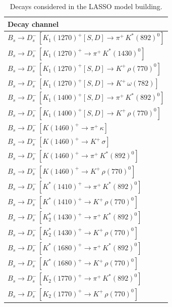 \begin{table}[h]
  \small
  \centering
  \caption{Decays considered in the LASSO model building. \label{tab:components}}
           \begin{tabular} {@{\hspace{0.5cm}}l@{\hspace{0.25cm}}}
     \hline \hline
	 Decay channel  \\ \hline
              $B_s \to D_s^- \, [K_{1}(1270)^{+}[S,D]\to \pi^+ \, K^{*}(892)^{0}]$ \\
              $B_s \to D_s^- \, [K_{1}(1270)^{+}\to \pi^+ \, K^{*}(1430)^{0}]$ \\
              $B_s \to D_s^- \, [K_{1}(1270)^{+}[S,D]\to K^+ \, \rho(770)^{0}]$ \\
              $B_s \to D_s^- \, [K_{1}(1270)^{+}[S,D]\to K^+ \, \omega(782)]$ \\
              $B_s \to D_s^- \, [K_{1}(1400)^{+}[S,D]\to \pi^+ \, K^{*}(892)^{0}]$ \\
              $B_s \to D_s^- \, [K_{1}(1400)^{+}[S,D]\to K^+ \, \rho(770)^{0}]$ \\
              $B_s \to D_s^- \, [K(1460)^{+}\to \pi^+ \, \kappa]$ \\
              $B_s \to D_s^- \, [K(1460)^{+}\to K^+ \, \sigma]$ \\
              $B_s \to D_s^- \, [K(1460)^{+}\to \pi^+ \, K^{*}(892)^{0}]$ \\
              $B_s \to D_s^- \, [K(1460)^{+}\to K^+ \, \rho(770)^{0}]$ \\
              $B_s \to D_s^- \, [K^{*}(1410)^+\to \pi^+\, K^{*}(892)^{0}]$ \\
              $B_s \to D_s^- \, [K^{*}(1410)^+\to K^+ \, \rho(770)^{0}]$ \\
              $B_s \to D_s^- \, [K_{2}^*(1430)^{+}\to \pi^+ \, K^{*}(892)^{0}]$ \\
              $B_s \to D_s^- \, [K_{2}^*(1430)^{+}\to K^+ \, \rho(770)^{0}]$ \\
              $B_s \to D_s^- \, [K^*(1680)^{+}\to \pi^+ \, K^{*}(892)^{0}]$ \\
              $B_s \to D_s^- \, [K^*(1680)^{+}\to K^+ \, \rho(770)^{0}]$ \\      
               $B_s \to D_s^- \, [K_{2}(1770)^{+}\to \pi^+ \, K^{*}(892)^{0}]$ \\
              $B_s \to D_s^- \, [K_{2}(1770)^{+}\to K^+ \, \rho(770)^{0}]$ \\

\end{tabular}
\end{table}
